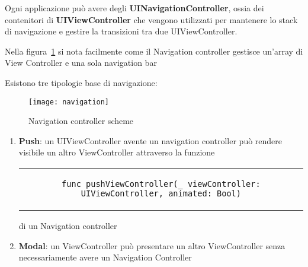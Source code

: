 Ogni applicazione può avere degli \textbf{UINavigationController}\cite{navigationcontroller},
ossia dei contenitori di \textbf{UIViewController}\cite{viewcontroller} che vengono
utilizzati per mantenere lo stack di navigazione e gestire la transizioni tra due UIViewController.

Nella figura~\ref{fig:1} si nota facilmente come il Navigation controller gestisce un'array di View Controller e una sola 
navigation bar

Esistono tre tipologie base di navigazione:

\begin{figure}
    \centering
    \begin{minipage}[b]{0.4\textwidth}
        \texttt{[image: navigation]}
        \caption{Navigation controller scheme}
        \label{fig:1}
    \end{minipage}
\end{figure}

\begin{enumerate}
    \item{\textbf{Push}: un UIViewController avente un navigation controller può rendere
    visibile un altro ViewController attraverso la funzione
    \begin{center}
        \begin{tabular}{c}
        \begin{lstlisting}
func pushViewController(_ viewController: UIViewController, animated: Bool)
        \end{lstlisting}
        \end{tabular}
    \end{center}
    di un Navigation controller
    }
    \item{\textbf{Modal}: un ViewController può presentare un altro ViewController senza necessariamente avere un 
    Navigation Controller
    }
\end{enumerate}


\normalsize